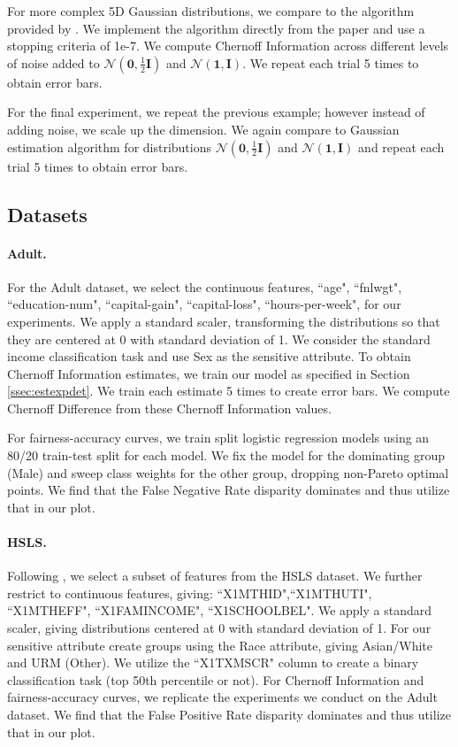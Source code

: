 \documentclass[11pt,letterpaper]{article}
\begin{document}
For more complex 5D Gaussian distributions, we compare to the algorithm provided by \citet{nielsen2022revisiting}. We implement the algorithm directly from the paper and use a stopping criteria of 1e-7. We compute Chernoff Information across different levels of noise added to $\mathcal{N}(\textbf{0}, \frac{1}{2}\mathbf{I})$ and $\mathcal{N}(\textbf{1},\textbf{I})$. We repeat each trial 5 times to obtain error bars.

For the final experiment, we repeat the previous example; however instead of adding noise, we scale up the dimension. We again compare to Gaussian estimation algorithm for distributions $\mathcal{N}(\textbf{0}, \frac{1}{2}\mathbf{I})$ and $\mathcal{N}(\textbf{1},\textbf{I})$ and repeat each trial 5 times to obtain error bars.

\subsection{Datasets} \label{ssec:dataexpdet}

\paragraph{Adult.} For the Adult dataset, we select the continuous features, ``age", ``fnlwgt", ``education-num", ``capital-gain", ``capital-loss", ``hours-per-week", for our experiments. We apply a standard scaler, transforming the distributions so that they are centered at 0 with standard deviation of 1. We consider the standard income classification task and use Sex as the sensitive attribute. To obtain Chernoff Information estimates, we train our model as specified in Section \ref{ssec:estexpdet}. We train each estimate 5 times to create error bars. We compute Chernoff Difference from these Chernoff Information values.

For fairness-accuracy curves, we train split logistic regression models using an 80/20 train-test split for each model. We fix the model for the dominating group (Male) and sweep class weights for the other group, dropping non-Pareto optimal points. We find that the False Negative Rate disparity dominates and thus utilize that in our plot.

\paragraph{HSLS.}

Following \citet{jeong2022fairness}, we select a subset of features from the HSLS dataset. We further restrict to continuous features, giving: ``X1MTHID",``X1MTHUTI", ``X1MTHEFF", ``X1FAMINCOME", ``X1SCHOOLBEL". We apply a standard scaler, giving distributions centered at 0 with standard deviation of 1. For our sensitive attribute create groups using the Race attribute, giving Asian/White and URM (Other). We utilize the ``X1TXMSCR" column to create a binary classification task (top 50th percentile or not). For Chernoff Information and fairness-accuracy curves, we replicate the experiments we conduct on the Adult dataset. We find that the False Positive Rate disparity dominates and thus utilize that in our plot.
\end{document}
